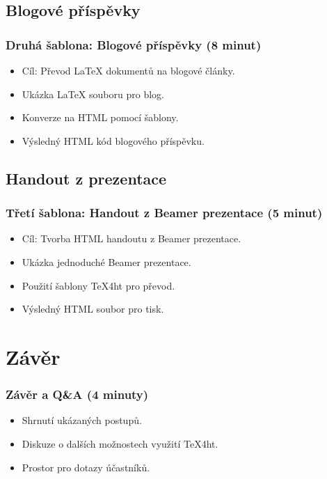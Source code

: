\documentclass{beamer}
\begin{document}
\subsection{Blogové příspěvky}
\begin{frame}
\frametitle{Druhá šablona: Blogové příspěvky (8 minut)}
\begin{itemize}
    \item Cíl: Převod LaTeX dokumentů na blogové články.
    \item Ukázka LaTeX souboru pro blog.
    \item Konverze na HTML pomocí šablony.
    \item Výsledný HTML kód blogového příspěvku.
\end{itemize}
\end{frame}

\subsection{Handout z prezentace}
\begin{frame}
\frametitle{Třetí šablona: Handout z Beamer prezentace (5 minut)}
\begin{itemize}
    \item Cíl: Tvorba HTML handoutu z Beamer prezentace.
    \item Ukázka jednoduché Beamer prezentace.
    \item Použití šablony TeX4ht pro převod.
    \item Výsledný HTML soubor pro tisk.
\end{itemize}
\end{frame}

\section{Závěr}

\begin{frame}
\frametitle{Závěr a Q\&A (4 minuty)}
\begin{itemize}
    \item Shrnutí ukázaných postupů.
    \item Diskuze o dalších možnostech využití TeX4ht.
    \item Prostor pro dotazy účastníků.
\end{itemize}
\end{frame}
\end{document}
